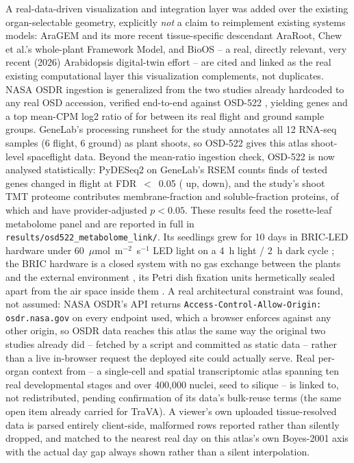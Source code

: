 A real-data-driven visualization and integration layer was added over the existing
organ-selectable geometry, explicitly \emph{not} a claim to reimplement existing systems
models: AraGEM \citep{DalMolin2010} and its more recent tissue-specific descendant AraRoot,
Chew et al.'s \citeyearpar{Chew2014} whole-plant Framework Model, and BioOS
\citep{BioOS2026} -- a real, directly relevant, very recent (2026) Arabidopsis digital-twin
effort -- are cited and linked as the real existing computational layer this visualization
complements, not duplicates. NASA OSDR ingestion is generalized from the two studies already
hardcoded to any real OSD accession, verified end-to-end against OSD-522
\citep{OSD522,Olanrewaju2023}, yielding \NumGenesOsdFiveTwoTwo{} genes and a top
mean-CPM log2 ratio of \TopFoldChangeOsdFiveTwoTwo{} for \texttt{\TopGeneOsdFiveTwoTwo{}}
between its real flight and ground sample groups. GeneLab's processing runsheet for the study
annotates all 12 RNA-seq samples (6 flight, 6 ground) as plant shoots, so OSD-522 gives this
atlas shoot-level spaceflight data. Beyond the mean-ratio ingestion check, OSD-522 is now
analysed statistically: PyDESeq2 on GeneLab's RSEM counts finds \NumDeGenesOsdFiveTwoTwo{} of
\NumGenesTestedOsdFiveTwoTwo{} tested genes changed in flight at FDR~$<$~0.05
(\NumDeUpOsdFiveTwoTwo{} up, \NumDeDownOsdFiveTwoTwo{} down), and the study's shoot TMT
proteome contributes \NumMemProteinsOsdFiveTwoTwo{} membrane-fraction and
\NumSolProteinsOsdFiveTwoTwo{} soluble-fraction proteins, of which
\NumMemProteinsSigOsdFiveTwoTwo{} and \NumSolProteinsSigOsdFiveTwoTwo{} have provider-adjusted
$p<0.05$. These results feed the rosette-leaf metabolome panel and are reported in full in
\texttt{results/osd522\_metabolome\_link/}. Its
seedlings grew for 10 days in BRIC-LED hardware under 60~$\mu$mol~m$^{-2}$~s$^{-1}$ LED light
on a 4~h light / 2~h dark cycle \citep{OSD522}; the BRIC hardware is a closed system with no
gas exchange between the plants and the external environment \citep{Olanrewaju2023}, its Petri
dish fixation units hermetically sealed apart from the air space inside them
\citep{Nicholson2021}. A real
architectural constraint was found,
not assumed: NASA OSDR's API returns \texttt{Access-Control-Allow-Origin: osdr.nasa.gov} on
every endpoint used, which a browser enforces against any other origin, so OSDR data reaches
this atlas the same way the original two studies already did -- fetched by a script and
committed as static data -- rather than a live in-browser request the deployed site could
actually serve. Real per-organ context from \citet{Lee2025} -- a single-cell and spatial
transcriptomic atlas spanning ten real developmental stages and over 400{,}000 nuclei,
seed to silique -- is linked to, not redistributed, pending confirmation of its data's
bulk-reuse terms (the same open item already carried for TraVA). A viewer's own uploaded
tissue-resolved data is parsed entirely client-side, malformed rows reported rather than
silently dropped, and matched to the nearest real day on this atlas's own Boyes-2001 axis
with the actual day gap always shown rather than a silent interpolation.

